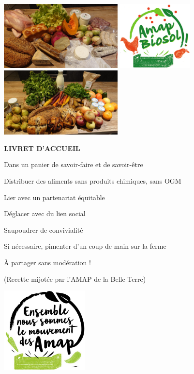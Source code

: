\documentclass[8pt,a4paper,french]{article}
\begin{document}
\includegraphics[height=3.5cm]{Gauche.jpg}
\includegraphics[height=3.5cm]{Centre.jpg}
\includegraphics[height=3.5cm]{Droite.jpg}
\vspace{30ex}

\begin{center}
{\bf\color{ForestGreen} LIVRET D'ACCUEIL {\the\year{}}}
\vspace{1ex}

Dans un panier de savoir-faire et de savoir-être

Distribuer des aliments sans produits chimiques, sans OGM

Lier avec un partenariat équitable

Déglacer avec du lien social

Saupoudrer de convivialité

Si nécessaire, pimenter d'un coup de main sur la ferme

À partager sans modération !
\vspace{1ex}

{\small (Recette mijotée par l'AMAP de la Belle Terre)}
\vspace{30ex}

\includegraphics[width=0.3333\textwidth]{Ensemble.jpg}
\end{center}
\end{document}
